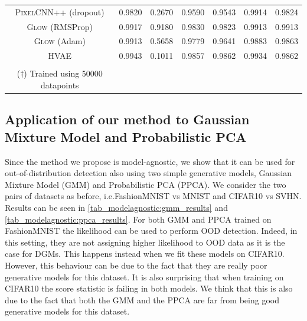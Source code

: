 {\begin{table}[tb]
{\begin{tabular}{ccccccc}
            \midrule
            \textsc{PixelCNN++} (dropout)  & 0.9820 & 0.2670 &  0.9590 &  0.9543 & 0.9914 & 0.9824 \\
            \textsc{Glow} (RMSProp)  &  0.9917  & 0.9180 & 0.9830 & 0.9823 & 0.9913  & 0.9913 \\
            \textsc{Glow} (Adam)   &0.9913 &  0.5658 & 0.9779 & 0.9641 & 0.9883 & 0.9863 \\
            \textsc{HVAE}  & 0.9943 &  0.1011  &  0.9857 &  0.9862 & 0.9934 &  0.9862 \\
            \bottomrule
            \vspace{-0.2cm}\\
            ($\dagger$) Trained using 50000 datapoints
        \end{tabular}    
        \label{tab_modelagnostic:results_second}
    }    
\end{table}    


\subsection{Application of our method to Gaussian Mixture Model and Probabilistic PCA}
\label{appendix_modelagnostic:gmm_ppca}
Since the method we propose is model-agnostic, we show that it can be used for out-of-distribution detection also using two simple generative models, Gaussian Mixture Model (GMM) and Probabilistic PCA (PPCA). We consider the two pairs of datasets as before, i.e.\@ FashionMNIST vs MNIST and CIFAR10 vs SVHN. Results can be seen in \cref{tab_modelagnostic:gmm_results} and \cref{tab_modelagnostic:ppca_results}. For both GMM and PPCA trained on FashionMNIST the likelihood can be used to perform OOD detection. Indeed, in this setting, they are not assigning higher likelihood to OOD data as it is the case for DGMs. This happens instead when we fit these models on CIFAR10. However, this behaviour can be due to the fact that they are really poor generative models for this dataset. It is also surprising that when training on CIFAR10 the score statistic is failing in both models. We think that this is also due to the fact that both the GMM and the PPCA are far from being good generative models for this dataset.


}
